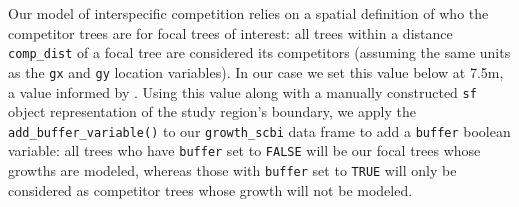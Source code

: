 \documentclass[12pt]{article}
\newenvironment{Shaded}{\begin{snugshade}}{\end{snugshade}}
\newcommand{\CommentTok}[1]{\textcolor[rgb]{0.56,0.35,0.01}{\textit{#1}}}
\newcommand{\DataTypeTok}[1]{\textcolor[rgb]{0.13,0.29,0.53}{#1}}
\newcommand{\DecValTok}[1]{\textcolor[rgb]{0.00,0.00,0.81}{#1}}
\newcommand{\FloatTok}[1]{\textcolor[rgb]{0.00,0.00,0.81}{#1}}
\newcommand{\KeywordTok}[1]{\textcolor[rgb]{0.13,0.29,0.53}{\textbf{#1}}}
\newcommand{\NormalTok}[1]{#1}
\newcommand{\OperatorTok}[1]{\textcolor[rgb]{0.81,0.36,0.00}{\textbf{#1}}}
\newcommand{\StringTok}[1]{\textcolor[rgb]{0.31,0.60,0.02}{#1}}
\begin{document}
Our model of interspecific competition relies on a spatial definition of
who the competitor trees are for focal trees of interest: all trees
within a distance \texttt{comp\_dist} of a focal tree are considered its
competitors (assuming the same units as the \texttt{gx} and \texttt{gy}
location variables). In our case we set this value below at 7.5m, a
value informed by \citet{canham_neighborhood_2004}
\citet{uriarte_spatially_2004} \citet{canham_neighborhood_2006}. Using
this value along with a manually constructed \texttt{sf} object
representation of the study region's boundary, we apply the
\texttt{add\_buffer\_variable()} to our \texttt{growth\_scbi} data frame
to add a \texttt{buffer} boolean variable: all trees who have
\texttt{buffer} set to \texttt{FALSE} will be our focal trees whose
growths are modeled, whereas those with \texttt{buffer} set to
\texttt{TRUE} will only be considered as competitor trees whose growth
will not be modeled.

\begin{Shaded}
\end{Shaded}
\end{document}

